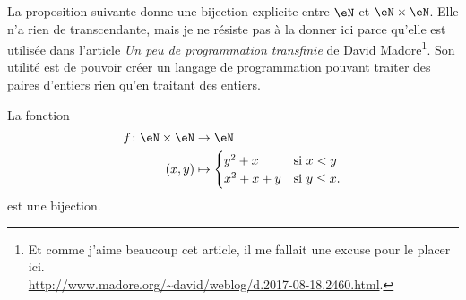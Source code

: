 La proposition suivante donne une bijection explicite entre \( \eN\) et \( \eN\times \eN\). Elle n'a rien de transcendante, mais je ne résiste pas à la donner ici parce qu'elle est utilisée dans l'article \emph{Un peu de programmation transfinie} de David Madore\footnote{Et comme j'aime beaucoup cet article, il me fallait une excuse pour le placer ici.\\ \url{http://www.madore.org/~david/weblog/d.2017-08-18.2460.html}.}. Son utilité est de pouvoir créer un langage de programmation pouvant traiter des paires d'entiers rien qu'en traitant des entiers.
\begin{proposition}        \label{PROPooLPKUooAlsYJg}
    La fonction
    \begin{equation}
        \begin{aligned}
            f\colon \eN\times \eN&\to \eN \\
            (x,y)&\mapsto \begin{cases}
                y^2+x    &   \text{si } x<y\\
                x^2+x+y    &    \text{si } y\leq x.
            \end{cases}
        \end{aligned}
    \end{equation}
    est une bijection.
\end{proposition}

